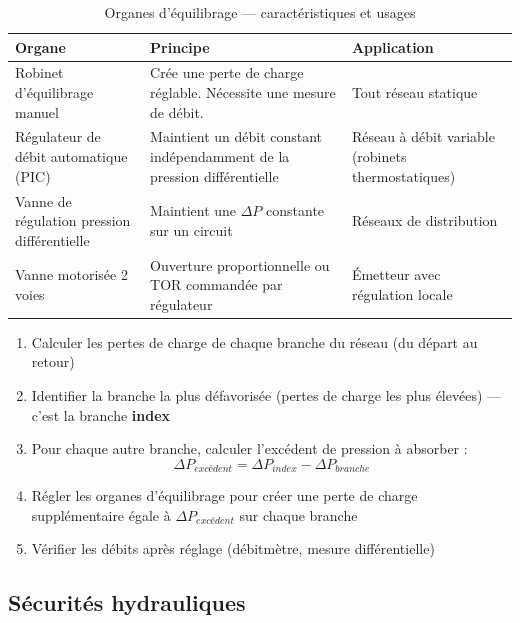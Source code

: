 \begin{table}[H]
  \centering
  \caption{Organes d'équilibrage — caractéristiques et usages}
  \begin{tabular}{p{3.5cm}p{5cm}p{4cm}}
    \toprule
    Organe & Principe & Application \\
    \midrule
    Robinet d'équilibrage manuel & Crée une perte de charge réglable. Nécessite une mesure de débit. & Tout réseau statique \\
    Régulateur de débit automatique (PIC) & Maintient un débit constant indépendamment de la pression différentielle & Réseau à débit variable (robinets thermostatiques) \\
    Vanne de régulation pression différentielle & Maintient une $\Delta P$ constante sur un circuit & Réseaux de distribution \\
    Vanne motorisée 2 voies & Ouverture proportionnelle ou TOR commandée par régulateur & Émetteur avec régulation locale \\
    \bottomrule
  \end{tabular}
\end{table}

\begin{methode}[title=Équilibrage par la méthode de la résistance équivalente (branche index)]
\begin{enumerate}
  \item Calculer les pertes de charge de chaque branche du réseau (du départ au retour)
  \item Identifier la branche la plus défavorisée (pertes de charge les plus élevées) — c'est la branche \textbf{index}
  \item Pour chaque autre branche, calculer l'excédent de pression à absorber :
    \[
      \Delta P_{excédent} = \Delta P_{index} - \Delta P_{branche}
    \]
  \item Régler les organes d'équilibrage pour créer une perte de charge supplémentaire égale à $\Delta P_{excédent}$ sur chaque branche
  \item Vérifier les débits après réglage (débitmètre, mesure différentielle)
\end{enumerate}
\end{methode}

\subsection{Sécurités hydrauliques}

